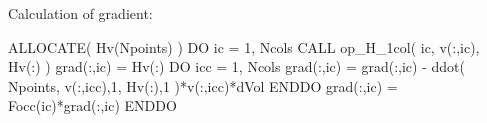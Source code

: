 Calculation of gradient:

\begin{fortrancode}
ALLOCATE( Hv(Npoints) )
DO ic = 1, Ncols
  CALL op_H_1col( ic, v(:,ic), Hv(:) )
  grad(:,ic) = Hv(:)
  DO icc = 1, Ncols
    grad(:,ic) = grad(:,ic) - ddot( Npoints, v(:,icc),1, Hv(:),1 )*v(:,icc)*dVol
  ENDDO
  grad(:,ic) = Focc(ic)*grad(:,ic)
ENDDO
\end{fortrancode}


